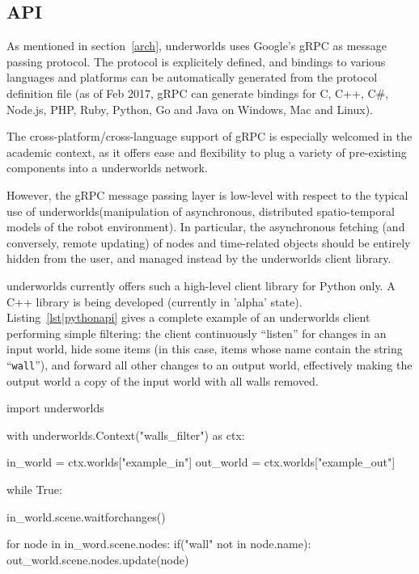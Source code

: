 \documentclass[letterpaper, 10 pt, conference]{ieeeconf}  %
\newcommand{\uwds}{{\sc underworlds}\xspace}
\begin{document}
\subsection{API}
\label{api}

As mentioned in section~\ref{arch}, \uwds uses Google's gRPC as message passing
protocol. The protocol is explicitely defined, and bindings to various languages
and platforms can be automatically generated from the protocol definition file
(as of Feb 2017, gRPC can generate bindings for C, C++, C\#, Node.js, PHP, Ruby,
Python, Go and Java on Windows, Mac and Linux).

The cross-platform/cross-language support of gRPC is especially welcomed in the
academic context, as it offers ease and flexibility to plug a variety of
pre-existing components into a \uwds network.


However, the gRPC message passing layer is low-level with respect to the typical
use of \uwds (manipulation of asynchronous, distributed spatio-temporal models
of the robot environment). In particular, the asynchronous fetching (and
conversely, remote updating) of nodes and time-related objects should be
entirely hidden from the user, and managed instead by the \uwds client library.

\uwds currently offers such a high-level client library for Python only. A C++
library is being developed (currently in 'alpha' state).
Listing~\ref{lst|pythonapi} gives a complete example of an \uwds client
performing simple filtering: the client continuously ``listen'' for changes in
an input world, hide some items (in this case, items whose name contain the
string ``{\tt wall}''), and forward all other changes to an output world,
effectively making the output world a copy of the input world with all walls
removed.

\begin{listing}[h!]

\begin{pythoncode}
import underworlds

with underworlds.Context("walls_filter") as ctx:

    in_world = ctx.worlds["example_in"]
    out_world = ctx.worlds["example_out"]

    while True:

        in_world.scene.waitforchanges()

        for node in in_word.scene.nodes:
            if("wall" not in node.name):
                out_world.scene.nodes.update(node)


\end{pythoncode}
    \caption{Example of a simple \uwds Python client named {\tt walls\_filter}:
    the client connects to the \uwds network, efficiently accesses the world
    {\tt example\_in}, filter out some objects, and publish the remaining
    objects in the world {\tt example\_out}.} \label{lst|pythonapi}
\end{listing}
\end{document}
